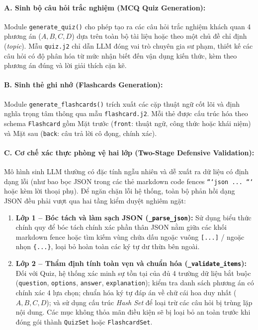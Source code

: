 ﻿\documentclass[12pt]{article}
\begin{document}
\paragraph{A. Sinh bộ câu hỏi trắc nghiệm (MCQ Quiz Generation):}
Module \texttt{generate\_quiz()} cho phép tạo ra các câu hỏi trắc nghiệm khách quan 4 phương án ($A, B, C, D$) dựa trên toàn bộ tài liệu hoặc theo một chủ đề chỉ định (\textit{topic}). Mẫu \texttt{quiz.j2} chỉ dẫn LLM đóng vai trò chuyên gia sư phạm, thiết kế các câu hỏi có độ phân hóa từ mức nhận biết đến vận dụng kiến thức, kèm theo phương án đúng và lời giải thích cặn kẽ.

\paragraph{B. Sinh thẻ ghi nhớ (Flashcards Generation):}
Module \texttt{generate\_flashcards()} trích xuất các cặp thuật ngữ cốt lõi và định nghĩa trọng tâm thông qua mẫu \texttt{flashcard.j2}. Mỗi thẻ được cấu trúc hóa theo schema \texttt{Flashcard} gồm Mặt trước (\texttt{front}: thuật ngữ, công thức hoặc khái niệm) và Mặt sau (\texttt{back}: câu trả lời cô đọng, chính xác).

\paragraph{C. Cơ chế xác thực phòng vệ hai lớp (Two-Stage Defensive Validation):}
Mô hình sinh LLM thường có đặc tính ngẫu nhiên và dễ xuất ra dữ liệu có định dạng lỗi (như bao bọc JSON trong các thẻ markdown code fences \texttt{```json ... ```} hoặc kèm lời thoại phụ). Để ngăn chặn lỗi hệ thống, toàn bộ phản hồi dạng JSON đều phải vượt qua hai tầng kiểm duyệt nghiêm ngặt:
\begin{enumerate}
    \item \textbf{Lớp 1 -- Bóc tách và làm sạch JSON (\texttt{\_parse\_json}):} Sử dụng biểu thức chính quy để bóc tách chính xác phần thân JSON nằm giữa các khối markdown fence hoặc tìm kiếm vùng chứa dấu ngoặc vuông \texttt{[...]} / ngoặc nhọn \texttt{\{...\}}, loại bỏ hoàn toàn các ký tự dư thừa bên ngoài.
    \item \textbf{Lớp 2 -- Thẩm định tính toàn vẹn và chuẩn hóa (\texttt{\_validate\_items}):} Đối với Quiz, hệ thống xác minh sự tồn tại của đủ 4 trường dữ liệu bắt buộc (\texttt{question}, \texttt{options}, \texttt{answer}, \texttt{explanation}); kiểm tra danh sách phương án có chính xác 4 lựa chọn; chuẩn hóa ký tự đáp án về chữ cái hoa duy nhất ($A, B, C, D$); và sử dụng cấu trúc \textit{Hash Set} để loại trừ các câu hỏi bị trùng lặp nội dung. Các mục không thỏa mãn điều kiện sẽ bị loại bỏ an toàn trước khi đóng gói thành \texttt{QuizSet} hoặc \texttt{FlashcardSet}.
\end{enumerate}
\end{document}
